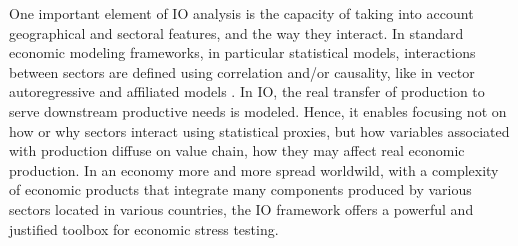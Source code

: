 \documentclass{article}
\begin{document}
\vspace{0.1cm}

One important element of IO analysis is the capacity of taking into account geographical and sectoral features, and the way they interact. In standard economic modeling frameworks, in particular statistical models, interactions between sectors are defined using correlation and/or causality, like in vector autoregressive and affiliated models \cite{lutkepohl2013vector}. In IO, the real transfer of production to serve downstream productive needs is modeled. Hence, it enables focusing not on how or why sectors interact using statistical proxies, but how variables associated with production diffuse on value chain, how they may affect real economic production. In an economy more and more spread worldwild, with a complexity of economic products that integrate many components produced by various sectors located in various countries, the IO framework offers a powerful and justified toolbox for economic stress testing. 

\vspace{0.1cm}
\end{document}
